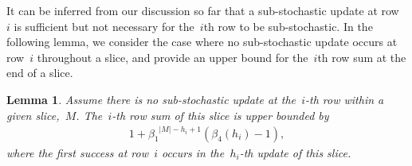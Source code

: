 \documentclass[draftclsnofoot, onecolumn, 12pt]{IEEEtran}
\newtheorem{lem}{Lemma}
\begin{document}
It can be inferred from our discussion so far that a sub-stochastic update at row~$i$ is sufficient but not necessary for the~$i$th row to be sub-stochastic. In the following lemma, we consider the case where no sub-stochastic update occurs at row~$i$ throughout a slice, and provide an upper bound for the~$i$th row sum at the end of a slice.
\begin{lem}\label{lm4}
Assume there is no sub-stochastic update at the~$i$-th row within a given slice,~$M$. The~$i$-th row sum of this slice is upper bounded by
\begin{eqnarray}
1+{\beta_1}^{\vert {M}\vert - {h}_{i} +1}({\beta}_4({h}_{i})-1), 
\end{eqnarray}
where the first success at row~$i$ occurs in the~${h}_{i}$-th update of this slice.
\end{lem}
\end{document}
